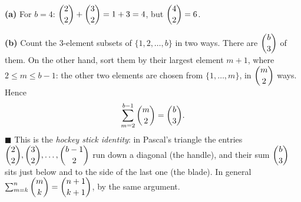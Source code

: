 \textbf{(a)} For $b=4$: $\dbinom22+\dbinom32=1+3=4$, but $\dbinom42=6$.

\textbf{(b)} Count the $3$-element subsets of $\{1,2,\dots,b\}$ in two ways. There are $\dbinom b3$ of them. On the other hand, sort them by their largest element $m+1$, where $2\le m\le b-1$: the other two elements are chosen from $\{1,\dots,m\}$, in $\dbinom m2$ ways. Hence
\[
\sum_{m=2}^{b-1}\dbinom m2=\dbinom b3 .
\]
$\blacksquare$ This is the \emph{hockey stick identity}: in Pascal's triangle the entries $\dbinom22,\dbinom32,\dots,\dbinom{b-1}{2}$ run down a diagonal (the handle), and their sum $\dbinom b3$ sits just below and to the side of the last one (the blade). In general $\sum_{m=k}^{n}\dbinom mk=\dbinom{n+1}{k+1}$, by the same argument.
